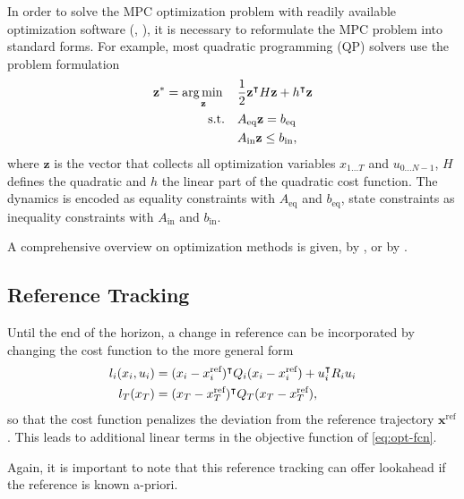 In order to solve the MPC optimization problem with readily available
optimization software (\eg \cite{Grant.Boyd:2014:CVX}, \cite{IBM:2016:CPLEX}),
it is necessary to reformulate the MPC problem into standard forms. For
example, most quadratic programming (QP) solvers use the problem formulation
\begin{subequations}
\begin{align}
  \mathbf{z}^*=\underset{\mathbf{z}}{\argmin} \quad
&\frac{1}{2} \mathbf{z}\T H \mathbf{z} + h\T \mathbf{z}\label{eq:opt-fcn}\\
\text{s.t.}\quad
& A_\text{eq} \mathbf{z} = b_\text{eq} \\
& A_\text{in} \mathbf{z} \leq b_\text{in},
\end{align}
\end{subequations}
where $\mathbf{z}$ is the vector that collects all optimization variables
$x_{1\dots T}$ and $u_{0\dots N-1}$, $H$ defines the quadratic and $h$ the
linear part of the quadratic cost function. The dynamics is encoded as equality
constraints  with $A_\text{eq}$ and $b_\text{eq}$, state constraints as
inequality constraints with $A_\text{in}$ and $b_\text{in}$.

A comprehensive overview on optimization methods is given, \eg by
\textcite{Nocedal.Wright:2006:Numerical}, or by
\textcite{Boyd.Vandenberghe:2004:Convex}.

\subsection{Reference Tracking}

Until the end of the horizon, a change in reference can be
incorporated by changing the cost function to the more general form
\begin{subequations}
\begin{align}
  l_i(x_i, u_i) &= (x_i - x^\text{ref}_i)^{\intercal} Q_i (x_i - x^\text{ref}_i)
  + u_i^{\intercal} R_i u_i \\
  l_T(x_T) &= (x_T - x^\text{ref}_T)^{\intercal} Q_T (x_T - x^\text{ref}_T),
\end{align}
\end{subequations}
so that the cost function penalizes the deviation from the reference trajectory
$\mathbf{x}^\text{ref}$. This leads to additional linear terms in the objective
function of \eqref{eq:opt-fcn}.

Again, it is important to note that this reference tracking can offer
lookahead if the reference is known a-priori.

